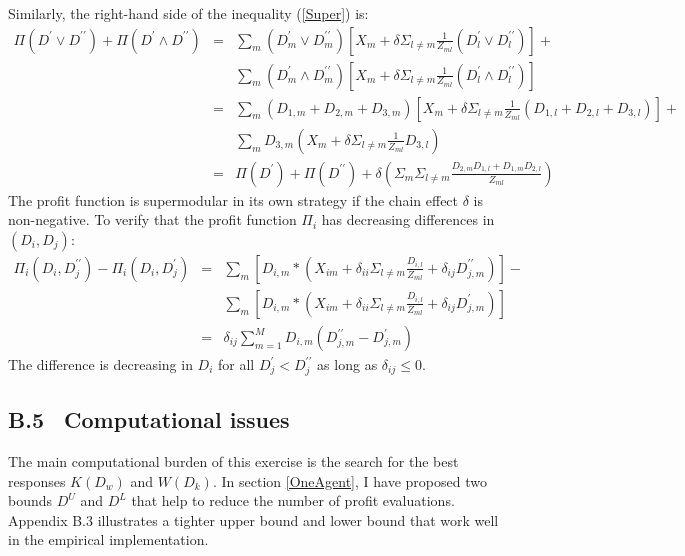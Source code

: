 \documentclass[notitlepage,onecolumn,11pt]{article}
\begin{document}
Similarly, the right-hand side of the inequality (\ref{Super}) is:%
\begin{eqnarray*}
\Pi (D^{\prime }\vee D^{\prime \prime })+\Pi (D^{\prime }\wedge D^{\prime
\prime }) &=&\sum\nolimits_{m}(D_{m}^{\prime }\vee D_{m}^{\prime \prime }) 
\left[ X_{m}+\delta \Sigma _{l\neq m}\frac{1}{Z_{ml}}(D_{l}^{\prime }\vee
D_{l}^{\prime \prime })\right] + \\
&&\sum\nolimits_{m}(D_{m}^{\prime }\wedge D_{m}^{\prime \prime })\left[
X_{m}+\delta \Sigma _{l\neq m}\frac{1}{Z_{ml}}(D_{l}^{\prime }\wedge
D_{l}^{\prime \prime })\right] \\
&=&\sum\nolimits_{m}(D_{1,m}+D_{2,m}+D_{3,m})\left[ X_{m}+\delta \Sigma
_{l\neq m}\frac{1}{Z_{ml}}(D_{1,l}+D_{2,l}+D_{3,l})\right] + \\
&&\sum\nolimits_{m}D_{3,m}(X_{m}+\delta \Sigma _{l\neq m}\frac{1}{Z_{ml}}%
D_{3,l}) \\
&=&\Pi (D^{\prime })+\Pi (D^{\prime \prime })+\delta (\Sigma _{m}\Sigma
_{l\neq m}\frac{D_{2,m}D_{1,l}+D_{1,m}D_{2,l}}{Z_{ml}})
\end{eqnarray*}%
The profit function is supermodular in its own strategy if the chain effect $%
\delta $ is non-negative. To verify that the profit function $\Pi _{i}$ has
decreasing differences in $(D_{i},D_{j})$:%
\begin{eqnarray*}
\Pi _{i}(D_{i},D_{j}^{\prime \prime })-\Pi _{i}(D_{i},D_{j}^{\prime })
&=&\sum\nolimits_{m}\left[ D_{i,m}\ast (X_{im}+\delta _{ii}\Sigma _{l\neq m}%
\frac{D_{i,l}}{Z_{ml}}+\delta _{ij}D_{j,m}^{\prime \prime })\right] - \\
&&\sum\nolimits_{m}\left[ D_{i,m}\ast (X_{im}+\delta _{ii}\Sigma _{l\neq m}%
\frac{D_{i,l}}{Z_{ml}}+\delta _{ij}D_{j,m}^{\prime })\right] \\
&=&\delta _{ij}\sum_{m=1}^{M}D_{i,m}(D_{j,m}^{\prime \prime
}-D_{j,m}^{\prime })
\end{eqnarray*}%
The difference is decreasing in $D_{i}$ for all $D_{j}^{\prime
}<D_{j}^{\prime \prime }$ as long as $\delta _{ij}\leq 0.$

\subsection*{B.5 \ Computational issues}

The main computational burden of this exercise is the search for the best
responses $K(D_{w})$ and $W(D_{k}).$ In section \ref{OneAgent}, I have
proposed two bounds $D^{U}$ and $D^{L}$ that help to reduce the number of
profit evaluations. Appendix B.3 illustrates a tighter upper bound and lower
bound that work well in the empirical implementation.
\end{document}
